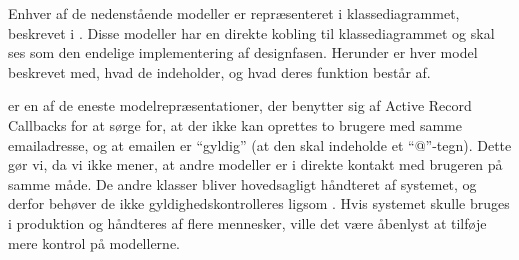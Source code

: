Enhver af de nedenstående modeller er repræsenteret i klassediagrammet, beskrevet i . Disse modeller har en direkte kobling til klassediagrammet og skal ses som den endelige implementering af designfasen. Herunder er hver model beskrevet med, hvad de indeholder, og hvad deres funktion består af.

 er en af de eneste modelrepræsentationer, der benytter sig af Active Record Callbacks for at sørge for, at der \fx ikke kan oprettes to brugere med samme emailadresse, og at emailen er ``gyldig'' (\fx at den skal indeholde et ``@''-tegn). Dette gør vi, da vi ikke mener, at andre modeller er i direkte kontakt med brugeren på samme måde. De andre klasser bliver hovedsagligt håndteret af systemet, og derfor behøver de \fx ikke gyldighedskontrolleres ligsom . Hvis systemet skulle bruges i produktion og håndteres af flere mennesker, ville det være åbenlyst at tilføje mere kontrol på modellerne.

